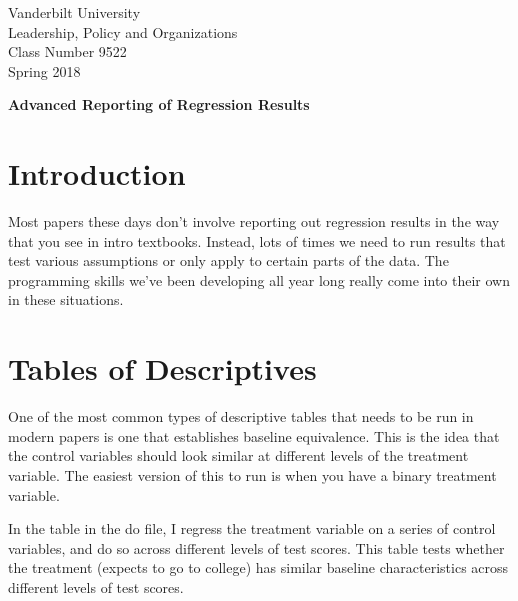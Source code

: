 \documentclass[12pt]{article}
\begin{document}
\thispagestyle{empty}%


\setlength{\parskip}{1ex plus 0.5ex minus 0.2ex}

\setcounter{secnumdepth}{-2}



\begin{flushleft}
Vanderbilt University\\Leadership, Policy and Organizations\\Class Number 9522\\ Spring 2018\\
\end{flushleft}

\begin{center}
\textbf{Advanced Reporting of Regression Results}
\end{center}

\section{Introduction}
\label{sec:introduction}

Most papers these days don't involve reporting out regression results in the way that you see in intro textbooks. Instead, lots of times we need to run results that test various assumptions or only apply to certain parts of the data. The programming skills we've been developing all year long really come into their own in these situations. 


\section{Tables of Descriptives}

One of the most common types of descriptive tables that needs to be run in modern papers is one that establishes baseline equivalence. This is the idea that the control variables should look similar at different levels of the treatment variable. The easiest version of this to run is when you have a binary treatment variable. 

In the table in the do file, I regress the treatment variable on a series of control variables, and do so across different levels of test scores. This table tests whether the treatment (expects to go to college) has similar baseline characteristics across different levels of test scores. 
\end{document}
